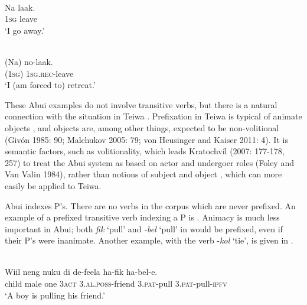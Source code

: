 \ea%
\label{bkm:Ref306280914}
 \\
\gll     Na  laak.\\  
     1\textsc{sg} leave \\
\glt  `I go away.'
\z








\ea%
\label{bkm:Ref306280918}
 \\ 
\gll     (Na)  no-laak.\\  
     (1\textsc{sg})  1\textsc{sg.rec}{}-leave \\
\glt  `I (am forced to) retreat.'
\z







These Abui  examples do not involve transitive verbs, but there is a natural connection with the situation in Teiwa . Prefixation in Teiwa is typical of animate objects  , and objects are, among other things, expected to be non-volitional  (Giv\'on 1985: 90; Malchukov 2005: 79; von Heusinger and Kaiser 2011: 4). It is semantic factors, such as volitionality, which leads Kratochv\'il (2007: 177-178, 257) to treat the Abui system as based on actor  and undergoer  roles (Foley and Van Valin 1984), rather than notions of subject  and object , which can more easily be applied to Teiwa.

Abui  indexes P's. There are no verbs in the corpus which are never prefixed. An example of a prefixed transitive verb indexing a P is . Animacy  is much less important in Abui; both \textit{fik} `pull' and \textit{{}-bel} `pull' in  would be prefixed, even if their P's were inanimate. Another example, with the verb -\textit{kol} `tie', is given in .


\ea%
\label{bkm:Ref306280933}
 \\ 
\gll    Wiil  neng  nuku  di  de-feela  ha-fik    ha-bel-e.      \\  
     child  male  one  3\textsc{act} 3.\textsc{al.poss}{}-friend  3.\textsc{pat}{}-pull  3\textsc{.pat}{}-pull-\textsc{ipfv}  \\
\glt  `A boy is pulling his friend.'  
\z









